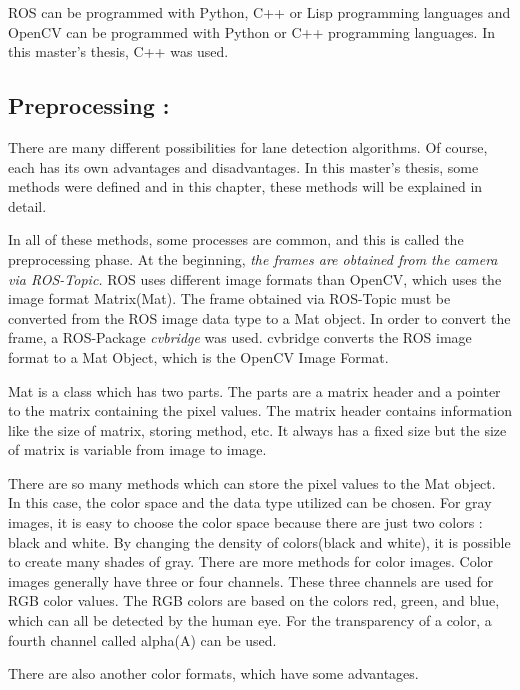 ROS can be programmed with Python, C++ or Lisp programming languages and OpenCV can be programmed with Python or C++ programming languages. In this master's thesis, C++ was used.

%
\subsection{Preprocessing :}\label{sec:Preprocessing}

There are many different possibilities for lane detection algorithms. Of course, each has its own advantages and disadvantages. In this master's thesis, some methods were defined and in this chapter, these methods will be explained in detail.

In all of these methods, some processes are common, and this is called the preprocessing phase. At the beginning,\emph{\color{blue} the frames are obtained from the camera via ROS-Topic.} ROS uses different image formats than OpenCV, which uses the image format Matrix(Mat). The frame obtained via ROS-Topic must be converted from the ROS image data type to a Mat object. In order to convert the frame, a ROS-Package \textit{cvbridge}\cite{cv_bridge} was used. cvbridge converts the ROS image format to a Mat Object, which is the OpenCV Image Format. 

Mat is a class which has two parts. The parts are a matrix header and a pointer to the matrix containing the pixel values. The matrix header contains information like the size of matrix, storing method, etc. It always has a fixed size but the size of matrix is variable from image to image.

There are so many methods which can store the pixel values to the Mat object. In this case, the color space and the data type utilized can be chosen. For gray images, it is easy to choose the color space because there are just two colors : black and white. By changing the density of colors(black and white), it is possible to create many shades of gray. There are more methods for color images. Color images generally have three or four channels. These three channels are used for RGB color values. The RGB colors are based on the colors red, green, and blue, which can all be detected by the human eye. For the transparency of a color, a fourth channel called alpha(A) can be used.

There are also another color formats, which have some advantages\cite{OpenCV_Mat}. 

